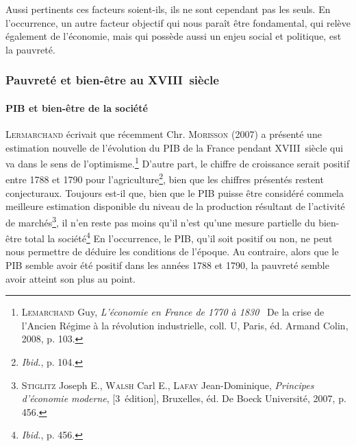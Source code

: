 \documentclass[a4paper,11pt,]{scrartcl}
\begin{document}
Aussi pertinents ces facteurs soient-ils, ils ne sont cependant pas les seuls. En l'occurrence, un autre facteur objectif qui nous paraît être fondamental, qui relève également de l'économie, mais qui possède aussi un enjeu social et politique, est la pauvreté.

\subsubsection{Pauvreté et bien-être au XVIII\ieme~siècle}

\paragraph{PIB et bien-être de la société}
\textsc{Lermarchand} écrivait que \og récemment Chr. \textsc{Morisson} (2007) a présenté une estimation nouvelle de l'évolution du PIB de la France pendant XVIII\ieme~siècle qui va dans le sens de l'optimisme.\fg\footnote{\textsc{Lemarchand} Guy, \emph{L'économie en France de 1770 à 1830} \textemdash~De la crise de l'Ancien Régime à la révolution industrielle, coll. U, Paris, éd. Armand Colin, 2008, p. 103.} D'autre part, le chiffre de croissance serait positif entre 1788 et 1790 pour l'agriculture\footnote{\emph{Ibid.}, p. 104.}, bien que les chiffres présentés restent conjecturaux. Toujours est-il que, bien que le PIB puisse être considéré comme\og la meilleure estimation disponible du niveau de la
production résultant de l'activité de marchés\fg\footnote{\textsc{Stiglitz} Joseph E., \textsc{Walsh} Carl E., \textsc{Lafay} Jean-Dominique, \emph{Principes d'économie moderne}, [3\ieme~édition], Bruxelles, éd. De Boeck Université, 2007, p. 456.}, il n'en reste pas moins qu'il \og n'est qu'une mesure partielle du bien-être total la société\fg\footnote{\emph{Ibid.}, p. 456.} En l'occurrence, le PIB, qu'il soit positif ou non, ne peut nous permettre de déduire les conditions de l'époque. Au contraire, alors que le PIB semble avoir été positif dans les années 1788 et 1790, la pauvreté semble avoir atteint son plus au point.
\end{document}
